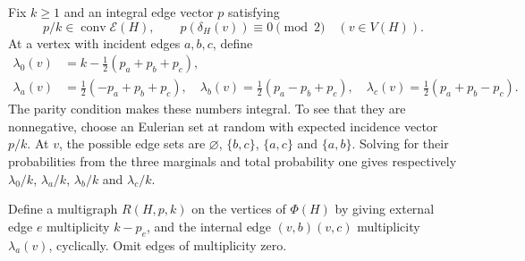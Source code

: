 \documentclass[10pt]{article}
\theoremstyle{definition}
\theoremstyle{remark}
\DeclareMathOperator{\conv}{conv}
\newcommand{\EC}{\mathcal E}
\begin{document}
Fix $k\geq1$ and an integral edge vector $p$ satisfying
\begin{equation}\label{eq:admissible}
 p/k\in\conv\EC(H),\qquad p(\delta_H(v))\equiv0\pmod2\quad(v\in V(H)).
\end{equation}
At a vertex with incident edges $a,b,c$, define
\begin{align}
 \lambda_0(v)&=k-\tfrac12(p_a+p_b+p_c),\label{eq:lambda0}\\
 \lambda_a(v)&=\tfrac12(-p_a+p_b+p_c),\quad
 \lambda_b(v)=\tfrac12(p_a-p_b+p_c),\quad
 \lambda_c(v)=\tfrac12(p_a+p_b-p_c).\label{eq:lambda}
\end{align}
The parity condition makes these numbers integral.
To see that they are nonnegative, choose an Eulerian set at random with expected incidence vector $p/k$.
At $v$, the possible edge sets are $\varnothing$, $\{b,c\}$, $\{a,c\}$ and $\{a,b\}$.
Solving for their probabilities from the three marginals and total probability one gives respectively $\lambda_0/k$, $\lambda_a/k$, $\lambda_b/k$ and $\lambda_c/k$.

Define a multigraph $R(H,p,k)$ on the vertices of $\Phi(H)$ by giving external edge $e$ multiplicity $k-p_e$, and the internal edge $(v,b)(v,c)$ multiplicity $\lambda_a(v)$, cyclically.
Omit edges of multiplicity zero.
\end{document}
